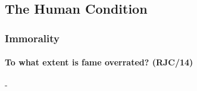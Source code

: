\documentclass[../../main]{subfiles}
\begin{document}
\subsection{The Human Condition}

\subsubsection{Immorality}

\paragraph{To what extent is fame overrated? (RJC/14)}-
\end{document}
